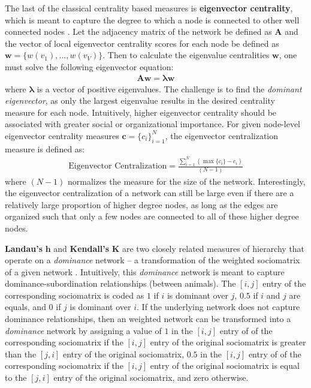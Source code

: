 \documentclass[3p,times]{elsarticle}
\begin{document}
The last of the classical centrality based measures is \textbf{eigenvector centrality}, which is meant to capture the degree to which a node is connected to other well connected nodes \cite{bonacich1972factoring}. Let the adjacency matrix of the network be defined as $\mathbf{A}$ and the vector of local eigenvector centrality scores for each node be defined as $\mathbf{w}=\{w({v_{1}}),...,w(v_{V})\}$. Then to calculate the eigenvalue centralities $\mathbf{w}$, one must solve the following eigenvector equation: 
\begin{align}
	\mathbf{A}  \mathbf{w}=  \mathbf{\lambda} \mathbf{w}
\end{align}
where $\mathbf{\lambda}$ is a vector of positive eigenvalues. The challenge is to find the \emph{dominant eigenvector}, as only the largest eigenvalue results in the desired centrality measure for each node. Intuitively, higher eigenvector centrality should be associated with greater social or organizational importance. For given node-level eigenvector centrality measures $\mathbf{c} = \{c_i\}_{i=1}^N$, the eigenvector centralization measure is defined as: 
\begin{align}
	\text{Eigenvector Centralization} = \frac{\sum_{i=1}^{N}{(\max\{c_{i}\}-c_{i})}}{(N-1)}
\end{align}
where $(N-1)$ normalizes the measure for the size of the network. Interestingly, the eigenvector centralization of a network can still be large even if there are a relatively large proportion of higher degree nodes, as long as the edges are organized such that only a few nodes are connected to all of these higher degree nodes.


\textbf{Landau's} $\mathbf{h}$ and \textbf{Kendall's} $\mathbf{K}$ are two closely related measures of hierarchy that operate on a \emph{dominance} network -- a transformation of the weighted sociomatrix of a given network \cite{Shizuka2012}. Intuitively, this \emph{dominance} network is meant to capture dominance-subordination relationships (between animals). The $[i,j]$ entry of the corresponding sociomatrix is coded as $1$ if $i$ is dominant over $j$, $0.5$ if $i$ and $j$ are equals, and $0$ if $j$ is dominant over $i$. If the underlying network does not capture dominance relationships, then an weighted network can be transformed into a \emph{dominance} network by assigning a value of $1$ in the $[i,j]$ entry of of the corresponding sociomatrix if the $[i,j]$ entry of the original sociomatrix is greater than the $[j,i]$ entry of the original sociomatrix, $0.5$ in the $[i,j]$ entry of of the corresponding sociomatrix if the $[i,j]$ entry of the original sociomatrix is equal to the $[j,i]$ entry of the original sociomatrix, and zero otherwise. 
\end{document}
